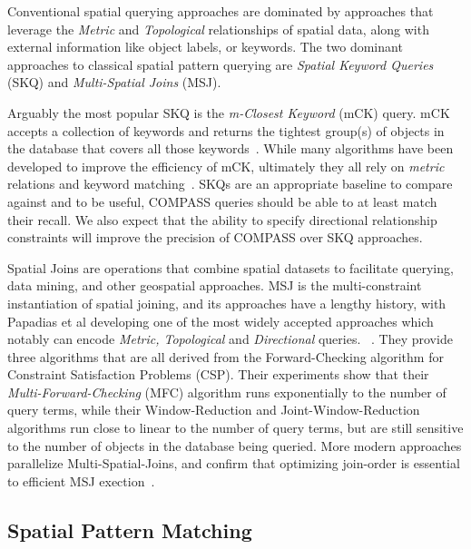\par{
    Conventional spatial querying approaches are dominated by approaches that leverage the \textit{Metric} and \textit{Topological} relationships of spatial data, along with external information like object labels, or keywords. 
    The two dominant approaches to classical spatial pattern querying are \textit{Spatial Keyword Queries} (SKQ) and \textit{Multi-Spatial Joins} (MSJ).} 
\par{
    Arguably the most popular SKQ is the \textit{m-Closest Keyword} (mCK) query. 
    mCK accepts a collection of keywords and returns the tightest group(s) of objects in the database that covers all those keywords~\cite{Zhang2009}.
    While many algorithms have been developed to improve the efficiency of mCK, ultimately they all rely on \textit{metric} relations and keyword matching~\cite{Guo2015}.
    SKQs are an appropriate baseline to compare against and to be useful, COMPASS queries should be able to at least match their recall. 
    We also expect that the ability to specify directional relationship constraints will improve the precision of COMPASS over SKQ approaches. 
    }
\par{
    Spatial Joins are operations that combine spatial datasets to facilitate querying, data mining, and other geospatial approaches.
    MSJ is the multi-constraint instantiation of spatial joining, and its approaches have a lengthy history, with Papadias et al developing one of the most widely accepted approaches which notably can encode \textit{Metric, Topological} and \textit{Directional} queries. ~\cite{Papadias1998}.
    They provide three algorithms that are all derived from the Forward-Checking algorithm for Constraint Satisfaction Problems (CSP). 
    Their experiments show that their \textit{Multi-Forward-Checking} (MFC) algorithm runs exponentially to the number of query terms, while their Window-Reduction and Joint-Window-Reduction algorithms run close to linear to the number of query terms, but are still sensitive to the number of objects in the database being queried.
    More modern approaches parallelize Multi-Spatial-Joins, and confirm that optimizing join-order is essential to efficient MSJ exection~\cite{Du2017}. 
}

\subsection*{Spatial Pattern Matching}

